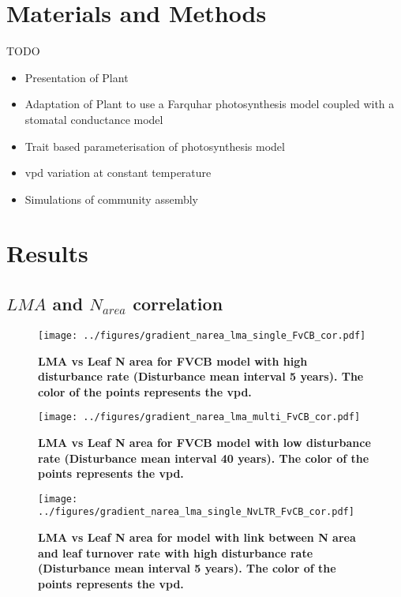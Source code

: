 \documentclass[a4paper,11pt]{article}
\begin{document}
\section{Materials and Methods}

TODO

\begin{itemize}

\item Presentation of Plant

\item Adaptation of Plant to use a Farquhar photosynthesis model coupled with a stomatal conductance model

\item Trait based parameterisation of photosynthesis model

\item vpd variation at constant temperature
  
\item Simulations of community assembly 

\end{itemize}



\clearpage

\section{Results}

\subsection{$LMA$ and $N_{area}$ correlation}

\begin{figure}[ht]
\centering
\texttt{[image: ../figures/gradient\_narea\_lma\_single\_FvCB\_cor.pdf]}
\caption{\textbf{LMA vs Leaf N area for FVCB model with high disturbance rate (Disturbance mean interval 5 years). The color of the points represents the vpd.}
\label{fig:lma_narea_cor_single}}
\end{figure}


\begin{figure}[ht]
\centering
\texttt{[image: ../figures/gradient\_narea\_lma\_multi\_FvCB\_cor.pdf]}
\caption{\textbf{LMA vs Leaf N area for FVCB model with low disturbance rate (Disturbance mean interval 40 years). The color of the points represents the vpd.}
\label{fig:lma_narea_cor_multi}}
\end{figure}


\begin{figure}[ht]
\centering
\texttt{[image: ../figures/gradient\_narea\_lma\_single\_NvLTR\_FvCB\_cor.pdf]}
\caption{\textbf{LMA vs Leaf N area for model with link between N area and leaf turnover rate with high disturbance rate (Disturbance mean interval 5 years). The color of the points represents the vpd.}
\label{fig:lma_narea_cor_single_NvLTR}}
\end{figure}
\end{document}
